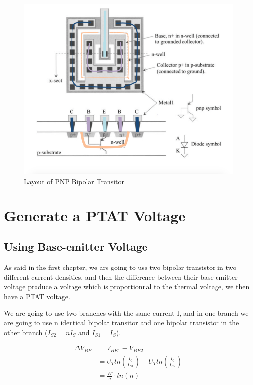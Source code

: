 \documentclass[11pt,a4paper]{report}
\begin{document}
\begin{figure}[h]
  \begin{center}
    \includegraphics[scale=0.5]{photo/PNP_CMOS}
  \end{center}
  \caption{Layout of PNP Bipolar Transitor}
  \label{PNPCMOS}
\end{figure}

\chapter{Generate a PTAT Voltage}
\section{Using Base-emitter Voltage}

As said in the first chapter, we are going to use two bipolar transistor in two different current densities, and then the difference between their base-emitter voltage produce a voltage which is proportionnal to the thermal voltage, we then have a PTAT voltage.

We are going to use two branches with the same current I, and in one branch we are going to use n identical bipolar transitor and one bipolar transistor in the other branch ($I_{S2} = n I_{S}$ and $I_{S1} = I_{S}$).

\begin{align}
  \Delta V_{BE} & = V_{BE1} - V_{BE2} \\
              & = U_T ln \left( \frac{I_0}{I_{S1}}\right) - U_T ln \left( \frac{I_0}{I_{S2}}\right) \\
              & = \frac{kT}{q} \cdot ln(n)
\end{align}
\end{document}
